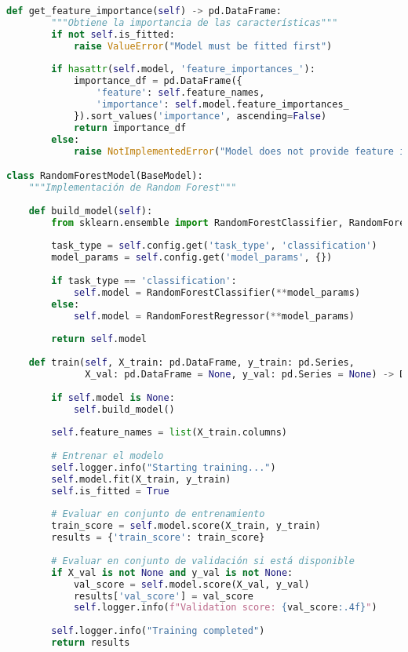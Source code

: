\begin{lstlisting}[language=Python, caption=Arquitectura base para modelos de ML]
    def get_feature_importance(self) -> pd.DataFrame:
        """Obtiene la importancia de las características"""
        if not self.is_fitted:
            raise ValueError("Model must be fitted first")
        
        if hasattr(self.model, 'feature_importances_'):
            importance_df = pd.DataFrame({
                'feature': self.feature_names,
                'importance': self.model.feature_importances_
            }).sort_values('importance', ascending=False)
            return importance_df
        else:
            raise NotImplementedError("Model does not provide feature importance")

class RandomForestModel(BaseModel):
    """Implementación de Random Forest"""
    
    def build_model(self):
        from sklearn.ensemble import RandomForestClassifier, RandomForestRegressor
        
        task_type = self.config.get('task_type', 'classification')
        model_params = self.config.get('model_params', {})
        
        if task_type == 'classification':
            self.model = RandomForestClassifier(**model_params)
        else:
            self.model = RandomForestRegressor(**model_params)
        
        return self.model
    
    def train(self, X_train: pd.DataFrame, y_train: pd.Series, 
              X_val: pd.DataFrame = None, y_val: pd.Series = None) -> Dict[str, Any]:
        
        if self.model is None:
            self.build_model()
        
        self.feature_names = list(X_train.columns)
        
        # Entrenar el modelo
        self.logger.info("Starting training...")
        self.model.fit(X_train, y_train)
        self.is_fitted = True
        
        # Evaluar en conjunto de entrenamiento
        train_score = self.model.score(X_train, y_train)
        results = {'train_score': train_score}
        
        # Evaluar en conjunto de validación si está disponible
        if X_val is not None and y_val is not None:
            val_score = self.model.score(X_val, y_val)
            results['val_score'] = val_score
            self.logger.info(f"Validation score: {val_score:.4f}")
        
        self.logger.info("Training completed")
        return results


\end{lstlisting}
